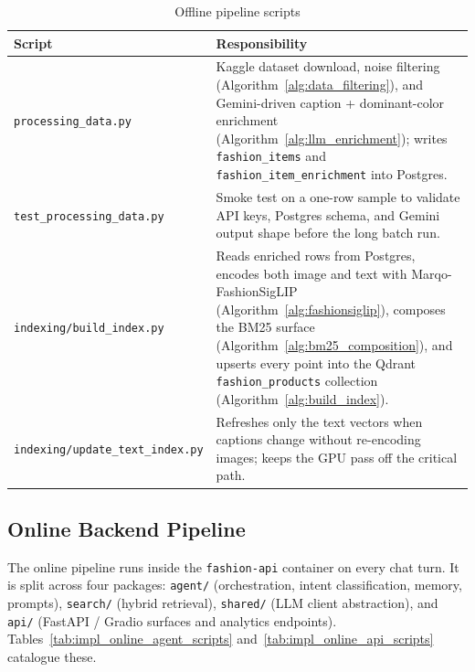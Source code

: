 \begin{table}[H]
\centering
\caption{Offline pipeline scripts}
\label{tab:impl_offline_scripts}
\small
\begin{tabular}{p{6.0cm} p{8.6cm}}
\toprule
\textbf{Script} & \textbf{Responsibility} \\
\midrule
\texttt{processing\_data.py} & Kaggle dataset download, noise filtering (Algorithm~\ref{alg:data_filtering}), and Gemini-driven caption + dominant-color enrichment (Algorithm~\ref{alg:llm_enrichment}); writes \texttt{fashion\_items} and \texttt{fashion\_item\_enrichment} into Postgres. \\
\texttt{test\_processing\_data.py} & Smoke test on a one-row sample to validate API keys, Postgres schema, and Gemini output shape before the long batch run. \\
\texttt{indexing/build\_index.py} & Reads enriched rows from Postgres, encodes both image and text with Marqo-FashionSigLIP (Algorithm~\ref{alg:fashionsiglip}), composes the BM25 surface (Algorithm~\ref{alg:bm25_composition}), and upserts every point into the Qdrant \texttt{fashion\_products} collection (Algorithm~\ref{alg:build_index}). \\
\texttt{indexing/update\_text\_index.py} & Refreshes only the text vectors when captions change without re-encoding images; keeps the GPU pass off the critical path. \\
\bottomrule
\end{tabular}
\end{table}

\subsection{Online Backend Pipeline}

The online pipeline runs inside the \texttt{fashion-api} container on every chat turn. It is split across four packages: \texttt{agent/} (orchestration, intent classification, memory, prompts), \texttt{search/} (hybrid retrieval), \texttt{shared/} (LLM client abstraction), and \texttt{api/} (FastAPI / Gradio surfaces and analytics endpoints). Tables~\ref{tab:impl_online_agent_scripts} and~\ref{tab:impl_online_api_scripts} catalogue these.

